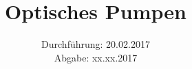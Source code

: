 

\subject{Versuch 21}
\title{Optisches Pumpen}
\date{Durchführung: 20.02.2017 \\
      Abgabe: xx.xx.2017}



\maketitle
\newpage







\printbibliography


